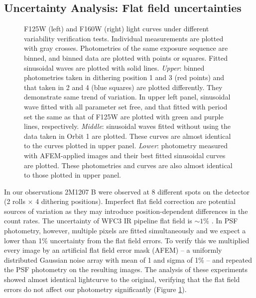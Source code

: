 \documentclass[apj]{emulateapj}
\begin{document}
\subsection{Uncertainty Analysis: Flat field uncertainties}

 \begin{figure}
  \centering
  \caption{F125W (left) and F160W (right) light curves under different
  variability verification tests. Individual measurements are plotted with gray
  crosses. Photometries of the same exposure sequence are binned, and
  binned data are plotted with points or squares. Fitted sinusoidal
  waves are plotted with solid lines. {\em Upper}: binned photometries taken
in dithering position 1 and 3 (red points) and that taken in 2 and 4
(blue squares) are plotted differently. They demonstrate same trend of
variation. In upper left panel, sinusoidal wave fitted with all
parameter set free, and that fitted with period set the same as that
of F125W are plotted with green and purple lines, respectively. {\em
  Middle}: sinusoidal waves fitted without using the data taken in
Orbit 1 are plotted. These curves are almost identical to the curves
plotted in upper panel. {\em Lower}: photometry measured with
AFEM-applied images and their best fitted sinusoidal curves are
plotted. These photometries and curves are also almost identical to
those plotted in upper panel.}
  \label{fig:2}
\end{figure}

In our observations 2M1207 B were observed at 8 different spots on the
detector (2 rolls $\times$ 4 dithering positions). Imperfect flat
field correction are potential sources of variation as they may
introduce position-dependent differences in the count rates. The
uncertainty of WFC3 IR pipeline flat field is $\sim 1\%$
\citep{dressel2012wide}.
In PSF photometry, however, multiple pixels are fitted simultaneously
and we expect a lower than 1\% uncertainty from the flat field
errors. To verify this we multiplied every image by an artificial flat
field error mask (AFEM) -- a uniformly distributed Gaussian noise array with
mean of 1 and sigma of 1\% -- and repeated the PSF photometry on the
resulting images.  The analysis of these experiments showed almost
identical lightcurve to the original, verifying that the flat field
errors do not affect our photometry significantly (Figure
\ref{fig:2}).
\end{document}
